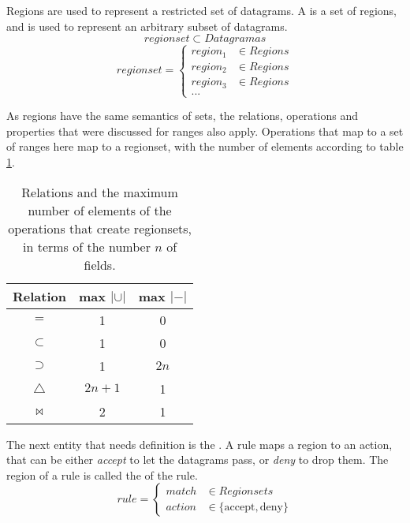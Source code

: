 Regions are used to represent a restricted set of datagrams. A
 is a set of regions, and is used to represent an arbitrary
subset of datagrams.
\begin{equation*}
	regionset \subset Datagramas
\end{equation*}
\begin{equation*}
	regionset =
	\begin{cases}
		region_1 & \in Regions \\
		region_2 & \in Regions \\
		region_3 & \in Regions \\
		...
	\end{cases}
\end{equation*}

As regions have the same semantics of sets, the relations, operations and
properties that were discussed for ranges also apply. Operations that map to a
set of ranges here map to a regionset, with the number of elements according to
table \ref{tab:regioesModuloOperacoes}.

\begin{table}
	\centering
	\caption{\label{tab:regioesModuloOperacoes}Relations and the maximum number
	of elements of the operations that create regionsets, in terms of the
	number $n$ of fields.}
	\begin{tabular}{ccc}
		Relation     & max $|\cup|$ & max $|-|$ \\
		\hline
		$=$          & 1        & 0 \\
		$\subset$    & 1        & 0 \\
		$\supset$    & 1        & $2n$ \\
		$\triangle$  & $2n+1$   & 1 \\
		$\bowtie$    & 2        & 1 \\
	\end{tabular}
\end{table}

The next entity that needs definition is the . A rule maps a
region to an action, that can be either \emph{accept} to let the datagrams pass,
or \emph{deny} to drop them. The region of a rule is called the 
of the rule.
\begin{equation*}
	rule =
	\begin{cases}
		match & \in Regionsets \\
		action & \in \{ \mbox{accept}, \mbox{deny} \}
	\end{cases}
\end{equation*}

